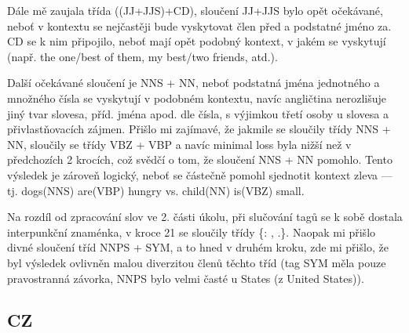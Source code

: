 \documentclass[12pt, a4paper]{report}
\theoremstyle{remark}
\begin{document}
Dále mě zaujala třída ((JJ+JJS)+CD), sloučení JJ+JJS bylo opět očekávané, neboť v kontextu se nejčastěji bude vyskytovat člen před a podstatné jméno za. CD se k nim připojilo, neboť mají opět podobný kontext, v jakém se vyskytují (např. the one/best of them, my best/two friends, atd.).

Další očekávané sloučení je NNS + NN, neboť podstatná jména jednotného a množného čísla se vyskytují v podobném kontextu, navíc angličtina nerozlišuje jiný tvar slovesa, příd. jména apod. dle čísla, s výjimkou třetí osoby u slovesa a přivlastňovacích zájmen. Přišlo mi zajímavé, že jakmile se sloučily třídy NNS + NN, sloučily se třídy VBZ + VBP a navíc minimal loss byla nižší než v předchozích 2 krocích, což svědčí o tom, že sloučení NNS + NN pomohlo. Tento výsledek je zároveň logický, neboť se částečně pomohl sjednotit kontext zleva --- tj. dogs(NNS) are(VBP) hungry vs. child(NN) is(VBZ) small. 

Na rozdíl od zpracování slov ve 2. části úkolu, při slučování tagů se k sobě dostala interpunkční znaménka, v kroce 21 se sloučily třídy \{{: , .}\}.
Naopak mi přišlo divné sloučení tříd NNPS + SYM, a to hned v druhém kroku, zde mi přišlo, že byl výsledek ovlivněn malou diverzitou členů těchto tříd (tag SYM měla pouze pravostranná závorka, NNPS bylo velmi časté u States (z United States)).

\subsection*{CZ}
\end{document}
